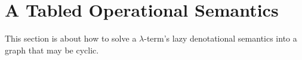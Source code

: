 \section{A Tabled Operational Semantics}\label{sec:bridge}
This section is about how to solve a $\lambda$-term's lazy denotational semantics into a graph that may be cyclic.

